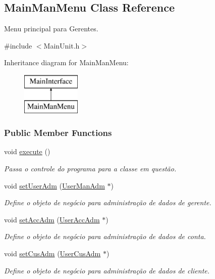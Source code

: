\hypertarget{classMainManMenu}{\subsection{Main\-Man\-Menu Class Reference}
\label{d0/d1d/classMainManMenu}
}


Menu principal para Gerentes.  




{\ttfamily \#include $<$Main\-Unit.\-h$>$}

Inheritance diagram for Main\-Man\-Menu\-:\begin{figure}[H]
\begin{center}
\leavevmode
\includegraphics[height=2.000000cm]{d0/d1d/classMainManMenu}
\end{center}
\end{figure}
\subsubsection*{Public Member Functions}
\begin{DoxyCompactItemize}
\item 
void \hyperlink{classMainManMenu_ac864c18863c5f308d0b9c52c223b4b9c}{execute} ()
\begin{DoxyCompactList}\small\item\em Passa o controle do programa para a classe em questão. \end{DoxyCompactList}\item 
void \hyperlink{classMainManMenu_aa4174687e0614fd63783c39340dfc17e}{set\-User\-Adm} (\hyperlink{classUserManAdm}{User\-Man\-Adm} $\ast$)
\begin{DoxyCompactList}\small\item\em Define o objeto de negócio para administração de dados de gerente. \end{DoxyCompactList}\item 
void \hyperlink{classMainManMenu_a507ebea41371d58e137ece5a11bb63bf}{set\-Acc\-Adm} (\hyperlink{classUserAccAdm}{User\-Acc\-Adm} $\ast$)
\begin{DoxyCompactList}\small\item\em Define o objeto de negócio para administração de dados de conta. \end{DoxyCompactList}\item 
void \hyperlink{classMainManMenu_a94b488d911497cf9453e9277806d5241}{set\-Cus\-Adm} (\hyperlink{classUserCusAdm}{User\-Cus\-Adm} $\ast$)
\begin{DoxyCompactList}\small\item\em Define o objeto de negócio para administração de dados de cliente. \end{DoxyCompactList}\end{DoxyCompactItemize}


